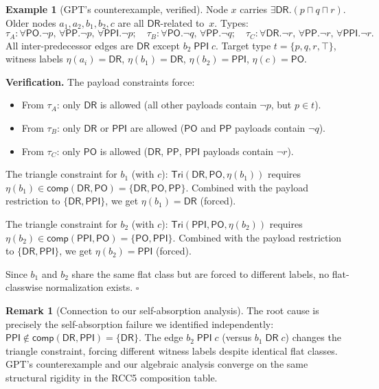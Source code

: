 \documentclass[a4paper,11pt]{article}
\theoremstyle{definition}
\newtheorem{example}[theorem]{Example}
\newtheorem{remark}[theorem]{Remark}
\newcommand{\DR}{\ensuremath{\mathsf{DR}}}
\newcommand{\PO}{\ensuremath{\mathsf{PO}}}
\newcommand{\PP}{\ensuremath{\mathsf{PP}}}
\newcommand{\PPI}{\ensuremath{\mathsf{PPI}}}
\newcommand{\comp}{\ensuremath{\mathsf{comp}}}
\newcommand{\Tri}{\ensuremath{\mathsf{Tri}}}
\begin{document}
\begin{example}[GPT's counterexample, verified]
\label{ex:flat-false}
Node $x$ carries $\exists\DR.(p \sqcap q \sqcap r)$.  Older nodes
$a_1, a_2, b_1, b_2, c$ are all $\DR$-related to~$x$.  Types:
\[
  \tau_A\!: \forall\PO.\neg p,\, \forall\PP.\neg p,\,
            \forall\PPI.\neg p;
  \quad
  \tau_B\!: \forall\PO.\neg q,\, \forall\PP.\neg q;
  \quad
  \tau_C\!: \forall\DR.\neg r,\, \forall\PP.\neg r,\,
            \forall\PPI.\neg r.
\]
All inter-predecessor edges are $\DR$ except $b_2\;\PPI\;c$.
Target type $t = \{p, q, r, \top\}$, witness labels $\eta(a_i) =
\DR$, $\eta(b_1) = \DR$, $\eta(b_2) = \PPI$, $\eta(c) = \PO$.

\smallskip\noindent
\textbf{Verification.}  The payload constraints force:
\begin{itemize}[nosep]
\item From $\tau_A$: only $\DR$ is allowed (all other payloads
  contain $\neg p$, but $p \in t$).
\item From $\tau_B$: only $\DR$ or $\PPI$ are allowed ($\PO$ and
  $\PP$ payloads contain $\neg q$).
\item From $\tau_C$: only $\PO$ is allowed ($\DR$, $\PP$, $\PPI$
  payloads contain $\neg r$).
\end{itemize}
The triangle constraint for $b_1$ (with $c$): $\Tri(\DR, \PO,
\eta(b_1))$ requires $\eta(b_1) \in \comp(\DR, \PO) = \{\DR, \PO,
\PP\}$.  Combined with the payload restriction to $\{\DR, \PPI\}$,
we get $\eta(b_1) = \DR$ (forced).

The triangle constraint for $b_2$ (with $c$): $\Tri(\PPI, \PO,
\eta(b_2))$ requires $\eta(b_2) \in \comp(\PPI, \PO) = \{\PO,
\PPI\}$.  Combined with the payload restriction to $\{\DR, \PPI\}$,
we get $\eta(b_2) = \PPI$ (forced).

Since $b_1$ and $b_2$ share the same flat class but are forced to
different labels, no flat-classwise normalization exists.  $\square$
\end{example}

\begin{remark}[Connection to our self-absorption analysis]
\label{rem:self-absorption}
The root cause is precisely the self-absorption failure we identified
independently: $\PPI \notin \comp(\DR, \PPI) = \{\DR\}$.  The edge
$b_2\;\PPI\;c$ (versus $b_1\;\DR\;c$) changes the triangle
constraint, forcing different witness labels despite identical flat
classes.  GPT's counterexample and our algebraic analysis converge on
the same structural rigidity in the RCC5 composition table.
\end{remark}
\end{document}

